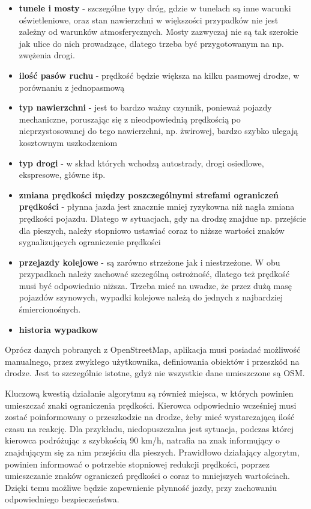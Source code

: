 \begin{itemize}
\item \textbf{tunele i mosty} - szczególne typy dróg, gdzie w tunelach są inne warunki oświetleniowe, oraz stan nawierzchni w większości przypadków nie jest zależny od warunków atmosferycznych. Mosty zazwyczaj nie są tak szerokie jak ulice do nich prowadzące, dlatego trzeba być przygotowanym na np. zwężenia drogi.
\item \textbf{ilość pasów ruchu} - prędkość będzie większa na kilku pasmowej drodze, w porównaniu z jednopasmową
\item \textbf{typ nawierzchni} - jest to bardzo ważny czynnik, ponieważ pojazdy mechaniczne, poruszając się z nieodpowiednią prędkością po nieprzystosowanej do tego nawierzchni, np. żwirowej, bardzo szybko ulegają kosztownym uszkodzeniom 
\item \textbf{typ drogi} - w skład których wchodzą autostrady, drogi osiedlowe, ekspresowe, główne itp.
\item \textbf{zmiana prędkości między poszczególnymi strefami ograniczeń prędkości} - płynna jazda jest znacznie mniej ryzykowna niż nagła zmiana prędkości pojazdu. Dlatego w sytuacjach, gdy na drodzę znajdue np. przejście dla pieszych, należy stopniowo ustawiać coraz to niższe wartości znaków sygnalizujących ograniczenie prędkości
\item \textbf{przejazdy kolejowe} - są zarówno strzeżone jak i niestrzeżone. W obu przypadkach należy zachować szczególną ostrożność, dlatego też prędkość musi być odpowiednio niższa. Trzeba mieć na uwadze, że przez dużą masę pojazdów szynowych, wypadki kolejowe należą do jednych z najbardziej śmiercionośnych.
\item \textbf{historia wypadkow}
\end{itemize}

Oprócz danych pobranych z OpenStreetMap, aplikacja musi posiadać możliwość manualnego, przez zwykłego użytkownika, definiowania obiektów i przeszkód na drodze. Jest to szczególnie istotne, gdyż nie wszystkie dane umieszczone są OSM. 


Kluczową kwestią działanie algorytmu są również miejsca, w których powinien umieszczać znaki ograniczenia prędkości. Kierowca odpowiednio wcześniej musi zostać poinformowany o przeszkodzie na drodze, żeby mieć wystarczającą ilość czasu na reakcję. Dla przykładu, niedopuszczalna jest sytuacja, podczas której kierowca podróżując z szybkością 90 km/h, natrafia na znak informujący o znajdującym się za nim przejściu dla pieszych. Prawidłowo działający algorytm, powinien informować o potrzebie stopniowej redukcji prędkości, poprzez umieszczanie znaków ograniczeń prędkości o coraz to mniejszych wartościach. Dzięki temu możliwe będzie zapewnienie płynność jazdy, przy zachowaniu odpowiedniego bezpieczeństwa.


